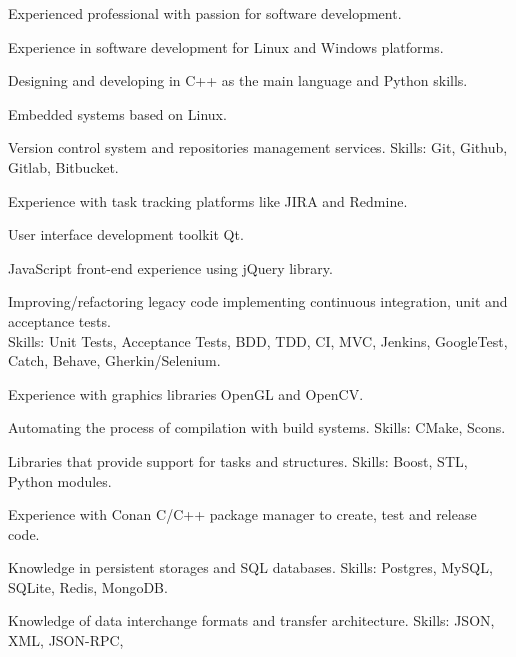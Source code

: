 

\begin{cvparagraph}

  \begin{svitems}
    \item {Experienced professional with passion for software development.}
    \item {Experience in software development for Linux and Windows platforms.}
    \item {Designing and developing in C++ as the main language and Python skills.}
    \item {Embedded systems based on Linux.}
    \item {Version control system and repositories management services. Skills: Git, Github, Gitlab, Bitbucket.}
    \item {Experience with task tracking platforms like JIRA and Redmine.}
    \item {User interface development toolkit Qt.}
    \item {JavaScript front-end experience using jQuery library.}
    \item {Improving/refactoring legacy code implementing continuous integration, unit and acceptance tests.\\
    Skills: Unit Tests, Acceptance Tests, BDD, TDD, CI, MVC, Jenkins, GoogleTest, Catch, Behave,
    Gherkin/Selenium.}
    \item {Experience with graphics libraries OpenGL and OpenCV.}
    \item {Automating the process of compilation with build systems. Skills: CMake, Scons.}
    \item {Libraries that provide support for tasks and structures. Skills: Boost, STL, Python modules.}
    \item {Experience with Conan C/C++ package manager to create, test and release code.}
    \item {Knowledge in persistent storages and SQL databases. Skills: Postgres, MySQL, SQLite, Redis,
    MongoDB.}
    \item {Knowledge of data interchange formats and transfer architecture. Skills: JSON, XML, JSON-RPC,
}
\end{svitems}
\end{cvparagraph}
